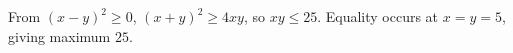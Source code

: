 From $(x-y)^2\ge0$, $(x+y)^2\ge4xy$, so $xy\le25$. Equality occurs at $x=y=5$, giving maximum $\boxed{25}$.
